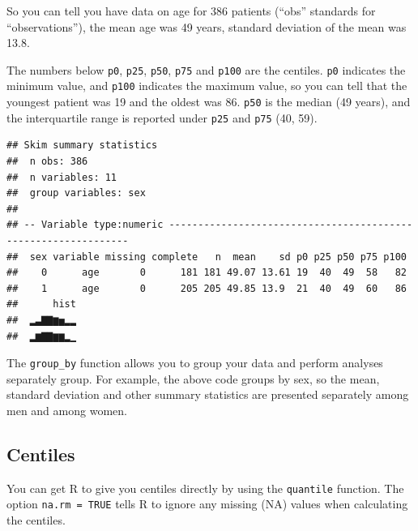 \documentclass[]{book}
\newenvironment{Shaded}{\begin{snugshade}}{\end{snugshade}}
\newcommand{\DataTypeTok}[1]{\textcolor[rgb]{0.13,0.29,0.53}{#1}}
\newcommand{\KeywordTok}[1]{\textcolor[rgb]{0.13,0.29,0.53}{\textbf{#1}}}
\newcommand{\NormalTok}[1]{#1}
\newcommand{\OperatorTok}[1]{\textcolor[rgb]{0.81,0.36,0.00}{\textbf{#1}}}
\newcommand{\OtherTok}[1]{\textcolor[rgb]{0.56,0.35,0.01}{#1}}
\newcommand{\StringTok}[1]{\textcolor[rgb]{0.31,0.60,0.02}{#1}}
\begin{document}
So you can tell you have data on age for 386 patients (``obs'' standards for ``observations''), the mean age was 49 years, standard deviation of the mean was 13.8.

The numbers below \texttt{p0}, \texttt{p25}, \texttt{p50}, \texttt{p75} and \texttt{p100} are the centiles. \texttt{p0} indicates the minimum value, and \texttt{p100} indicates the maximum value, so you can tell that the youngest patient was 19 and the oldest was 86. \texttt{p50} is the median (49 years), and the interquartile range is reported under \texttt{p25} and \texttt{p75} (40, 59).

\begin{Shaded}
\end{Shaded}

\begin{verbatim}
## Skim summary statistics
##  n obs: 386 
##  n variables: 11 
##  group variables: sex 
## 
## -- Variable type:numeric ---------------------------------------------------------------
##  sex variable missing complete   n  mean    sd p0 p25 p50 p75 p100
##    0      age       0      181 181 49.07 13.61 19  40  49  58   82
##    1      age       0      205 205 49.85 13.9  21  40  49  60   86
##      hist
##  ▂▃▇▇▆▅▂▂
##  ▂▆▇▇▆▆▂▁
\end{verbatim}

The \texttt{group\_by} function allows you to group your data and perform analyses separately group. For example, the above code groups by sex, so the mean, standard deviation and other summary statistics are presented separately among men and among women.

\hypertarget{centiles}{%
\subsection{Centiles}\label{centiles}}

You can get R to give you centiles directly by using the \texttt{quantile} function. The option \texttt{na.rm\ =\ TRUE} tells R to ignore any missing (NA) values when calculating the centiles.

\begin{Shaded}
\end{Shaded}
\end{document}
